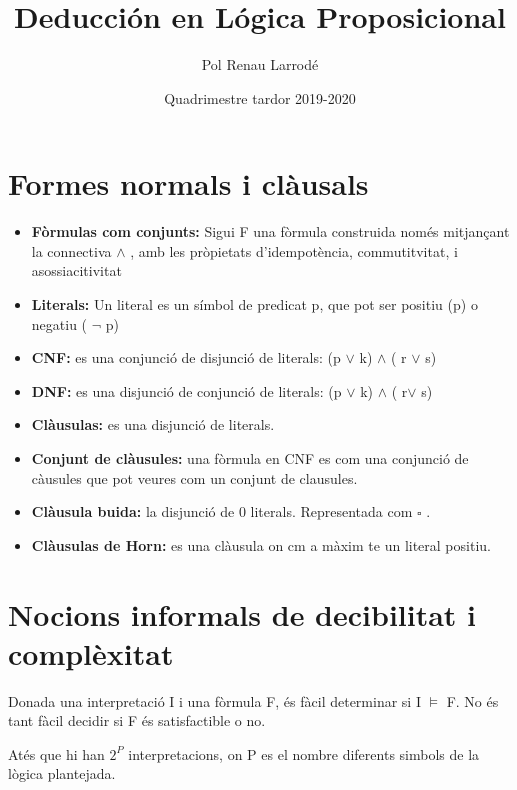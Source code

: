 \documentclass{article}
\title{Deducci\'on en L\'ogica Proposicional}
\author{Pol Renau Larrod\'e}
\date{Quadrimestre tardor 2019-2020}
\begin{document}
  \maketitle
  \newpage

  \tableofcontents
  \newpage

  \section{Formes normals i cl\`ausals}
    \begin{itemize}
      \item  \textbf{F\`ormulas com conjunts:}  Sigui  F una f\`ormula construida nom\'es mitjançant la connectiva $\land$ , amb les pr\`opietats d'idempot\`encia, commutitvitat, i asossiacitivitat %
      \item  \textbf{Literals:} Un literal es un  s\'imbol de predicat p, que pot ser positiu (p) o negatiu ( $\neg$ p)
      \item  \textbf{CNF: } es una conjunci\'o de disjunci\'o de literals: (p  $\lor$ k) $\land$ ( r $\lor$ s)
      \item  \textbf{DNF: } es una disjunci\'o de conjunci\'o de literals: (p  $\lor$ k) $\land$ (  r$\lor$ s)
      \item  \textbf{Cl\`ausulas: } es una disjunci\'o de literals.
      \item  \textbf{Conjunt de cl\`ausules: } una f\`ormula en CNF es com una conjunci\'o de c\`ausules  que pot veures com un conjunt de clausules.
      \item  \textbf{Cl\`ausula buida: } la disjunci\'o de 0 literals. Representada com $\square$ .
      \item  \textbf{Cl\`ausulas de Horn: } es una cl\`ausula on cm a m\`axim te un literal positiu.
    \end{itemize}

  \section{Nocions  informals de decibilitat i compl\`exitat}

  Donada una interpretaci\'o I i una f\`ormula F, \'es f\`acil determinar si I $\models$ F. No \'es tant f\`acil decidir si F \'es satisfactible o no.

  At\'es que hi han $2^{P}$ interpretacions, on P es el nombre diferents simbols de la l\`ogica plantejada.
\end{document}
